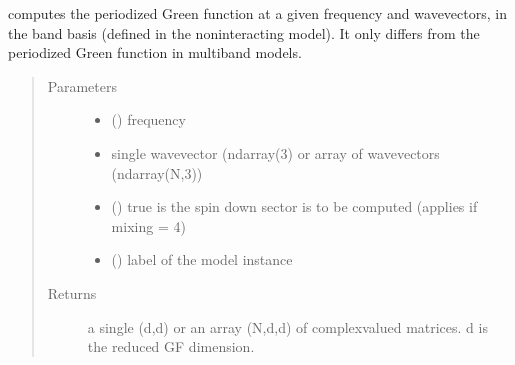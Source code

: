 \documentclass[letterpaper,10pt,english]{sphinxmanual}
\begin{document}
\begin{fulllineitems}
\label{\detokenize{functions:pyqcm.band_Green_function}}
\sphinxAtStartPar
computes the periodized Green function at a given frequency and wavevectors, in the band basis (defined
in the noninteracting model). It only differs from the periodized Green function in multi\sphinxhyphen{}band models.
\begin{quote}\begin{description}
\item[{Parameters}] \leavevmode\begin{itemize}
\item {} 
\sphinxAtStartPar
{} () \textendash{} frequency

\item {} 
\sphinxAtStartPar
{} \textendash{} single wavevector (ndarray(3) or array of wavevectors (ndarray(N,3))

\item {} 
\sphinxAtStartPar
{} () \textendash{} true is the spin down sector is to be computed (applies if mixing = 4)

\item {} 
\sphinxAtStartPar
{} () \textendash{} label of the model instance

\end{itemize}

\item[{Returns}] \leavevmode
\sphinxAtStartPar
a single (d,d) or an array (N,d,d) of complex\sphinxhyphen{}valued matrices. d is the reduced GF dimension.

\end{description}\end{quote}

\end{fulllineitems}
\end{document}
